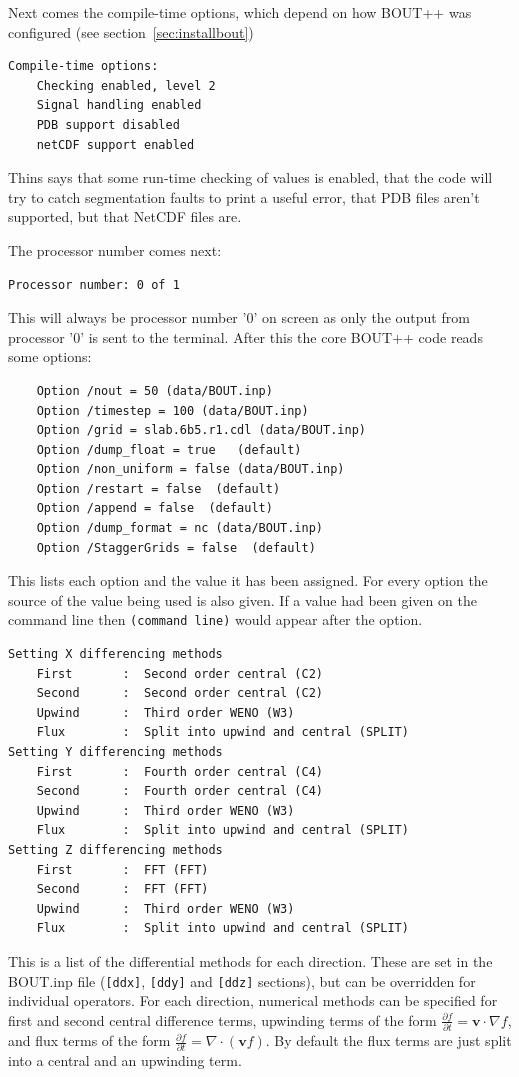 \documentclass[12pt]{article}
\newcommand{\code}[1]{\texttt{#1}}
\newcommand{\ve}[1]{\ensuremath{\boldsymbol{#1}}}
\newcommand{\deriv}[2]{\ensuremath{\frac{\partial #1}{\partial #2}}}
\begin{document}
Next comes the compile-time options, which depend on how BOUT++ was configured
(see section~\ref{sec:installbout})
%
\begin{verbatim}
Compile-time options:
	Checking enabled, level 2
	Signal handling enabled
	PDB support disabled
	netCDF support enabled
\end{verbatim}
%
Thins says that some run-time checking of values is enabled, that the code will
try to catch segmentation faults to print a useful error, that PDB files aren't
supported, but that NetCDF files are.

The processor number comes next:
%
\begin{verbatim}
Processor number: 0 of 1
\end{verbatim}
%
This will always be processor number '0' on screen as only the output from
processor '0' is sent to the terminal. After this the core BOUT++ code reads
some options:
%
\begin{verbatim}
	Option /nout = 50 (data/BOUT.inp)
	Option /timestep = 100 (data/BOUT.inp)
	Option /grid = slab.6b5.r1.cdl (data/BOUT.inp)
	Option /dump_float = true   (default)
	Option /non_uniform = false (data/BOUT.inp)
	Option /restart = false  (default)
	Option /append = false  (default)
	Option /dump_format = nc (data/BOUT.inp)
	Option /StaggerGrids = false  (default)
\end{verbatim}
%
This lists each option and the value it has been assigned.  For every option
the source of the value being used is also given.  If a value had been given on
the command line then \texttt{(command line)} would appear after the option.

%
\begin{verbatim}
Setting X differencing methods
	First       :  Second order central (C2)
	Second      :  Second order central (C2)
	Upwind      :  Third order WENO (W3)
	Flux        :  Split into upwind and central (SPLIT)
Setting Y differencing methods
	First       :  Fourth order central (C4)
	Second      :  Fourth order central (C4)
	Upwind      :  Third order WENO (W3)
	Flux        :  Split into upwind and central (SPLIT)
Setting Z differencing methods
	First       :  FFT (FFT)
	Second      :  FFT (FFT)
	Upwind      :  Third order WENO (W3)
	Flux        :  Split into upwind and central (SPLIT)
\end{verbatim}
%
This is a list of the differential methods for each direction. These are set in
the BOUT.inp file (\code{[ddx]}, \code{[ddy]} and \code{[ddz]} sections), but
can be overridden for individual operators. For each direction, numerical
methods can be specified for first and second central difference terms,
upwinding terms of the form $\deriv{f}{t} = \ve{v}\cdot\nabla f$, and
flux terms of the form $\deriv{f}{t} = \nabla\cdot\left(\ve{v}f\right)$.
By default the flux terms are just split into a central and an upwinding term.
\end{document}
